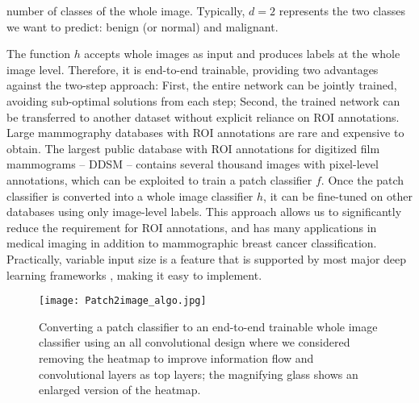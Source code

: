 \documentclass[12pt,letterpaper]{article}
\begin{document}
number of classes of the whole image. Typically, $d = 2$ represents the two classes we want to predict: benign (or normal) and malignant. 

The function $h$ accepts whole images as input and produces labels at the whole image level. Therefore, it is end-to-end trainable, providing two advantages against the two-step approach: First, the entire network can be jointly trained, avoiding sub-optimal solutions from each step; Second, the trained network can be transferred to another dataset without explicit reliance on ROI annotations. Large mammography databases with ROI annotations are rare and expensive to obtain. The largest public database with ROI annotations for digitized film mammograms – DDSM \cite{heath_digital_2001} – contains several thousand images with pixel-level annotations, which can be exploited to train a patch classifier $f$. Once the patch classifier is converted into a whole image classifier $h$, it can be fine-tuned on other databases using only image-level labels. This approach allows us to significantly reduce the requirement for ROI annotations, and has many applications in medical imaging in addition to mammographic breast cancer classification. Practically, variable input size is a feature that is supported by most major deep learning frameworks \cite{chollet_keras_2015,abadi_tensorflow_2015,jia_caffe_2014,chen_mxnet_2015}, making it easy to implement. 

\begin{figure}
  \centering
  \texttt{[image: Patch2image\_algo.jpg]}
\caption{Converting a patch classifier to an end-to-end trainable whole image classifier using an all convolutional design where we considered removing the heatmap to improve information flow and convolutional layers as top layers; the magnifying glass shows an enlarged version of the heatmap.}
  \label{fig:patch2image}
\end{figure}
\end{document}
